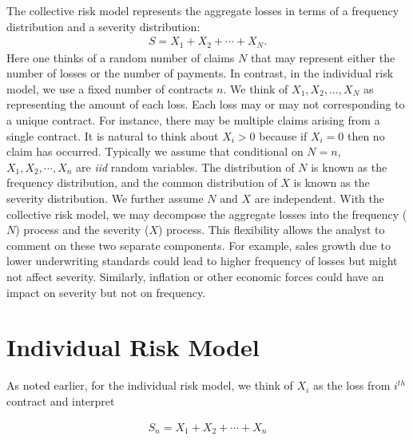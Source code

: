 \documentclass[]{book}
\theoremstyle{definition}
\theoremstyle{definition}
\theoremstyle{definition}
\theoremstyle{remark}
\begin{document}
The collective risk model represents the aggregate losses in terms of a
frequency distribution and a severity distribution: \[\begin{aligned}
S=X_1 +X_2 +\cdots+X_N.
\end{aligned}\] Here one thinks of a random number of claims \(N\) that
may represent either the number of losses or the number of payments. In
contrast, in the individual risk model, we use a fixed number of
contracts \(n\). We think of \(X_1, X_2, \ldots, X_N\) as representing
the amount of each loss. Each loss may or may not corresponding to a
unique contract. For instance, there may be multiple claims arising from
a single contract. It is natural to think about \(X_i>0\) because if
\(X_i=0\) then no claim has occurred. Typically we assume that
conditional on \(N=n\), \(X_{1},X_{2},\cdots ,X_{n}\) are \emph{iid}
random variables. The distribution of \(N\) is known as the frequency
distribution, and the common distribution of \(X\) is known as the
severity distribution. We further assume \(N\) and \(X\) are
independent. With the collective risk model, we may decompose the
aggregate losses into the frequency (\(N\)) process and the severity
(\(X\)) process. This flexibility allows the analyst to comment on these
two separate components. For example, sales growth due to lower
underwriting standards could lead to higher frequency of losses but
might not affect severity. Similarly, inflation or other economic forces
could have an impact on severity but not on frequency.

\section{Individual Risk Model}\label{individual-risk-model}

As noted earlier, for the individual risk model, we think of \(X_i\) as
the loss from \(i^{th}\) contract and interpret

\begin{eqnarray*}
S_n=X_1 +X_2 +\cdots+X_n
\end{eqnarray*}
\end{document}
